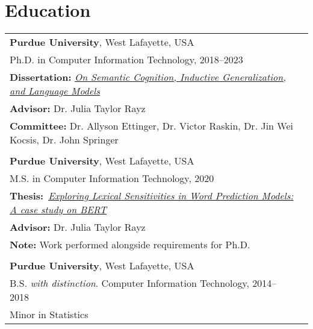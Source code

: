 \documentclass[11pt]{article}
\begin{document}
\section*{Education}
\begin{tabularx}{\textwidth}{@{}p{\textwidth}l}
\textbf{Purdue University}, West Lafayette, USA\\
Ph.D. in Computer Information Technology, 2018--2023\\
\textbf{Dissertation:} \href{https://hammer.purdue.edu/articles/thesis/On_Semantic_Cognition_Inductive_Generalization_and_Language_Models/24084816}{\textit{On Semantic Cognition, Inductive Generalization, and Language Models}}\\
\textbf{Advisor:} Dr. Julia Taylor Rayz\\
\textbf{Committee:} Dr. Allyson Ettinger, Dr. Victor Raskin, Dr. Jin Wei Kocsis, Dr. John Springer\\\\
\textbf{Purdue University}, West Lafayette, USA\\
M.S. in Computer Information Technology, 2020\\
\textbf{Thesis:}~\href{https://hammer.figshare.com/articles/thesis/Exploring_Lexical_Sensitivities_in_Word_Prediction_Models_A_case_study_on_BERT/13308830}{\textit{Exploring Lexical Sensitivities in Word Prediction Models: A case study on BERT}}\\
\textbf{Advisor:} Dr. Julia Taylor Rayz\\
\textbf{Note:} Work performed alongside requirements for Ph.D.\\\\

\textbf{Purdue University}, West Lafayette, USA\\
B.S. \textit{with distinction}. Computer Information Technology, 2014--2018\\
Minor in Statistics
\end{tabularx}
\end{document}
